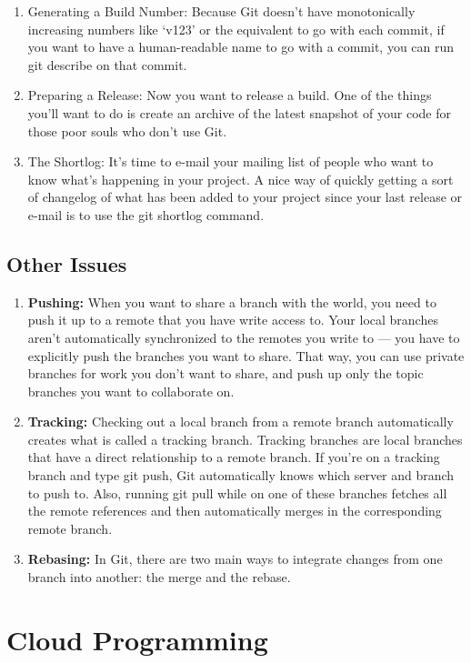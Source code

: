 \documentclass[draftclsnofoot,journal,onecolumn,12pt]{IEEEtran}
\begin{document}
\begin{enumerate}
  \item Generating a Build Number: Because Git doesn’t have monotonically increasing numbers like ‘v123’ or the equivalent to go with each commit, if you want to have a human-readable name to go with a commit, you can run git describe on that commit.
  \item Preparing a Release: Now you want to release a build. One of the things you’ll want to do is create an archive of the latest snapshot of your code for those poor souls who don’t use Git.
  \item The Shortlog: It’s time to e-mail your mailing list of people who want to know what’s happening in your project. A nice way of quickly getting a sort of changelog of what has been added to your project since your last release or e-mail is to use the git shortlog command.
\end{enumerate}

\subsection{Other Issues}
\begin{enumerate}
  \item \textbf{Pushing:} When you want to share a branch with the world, you need to push it up to a remote that you have write access to. Your local branches aren’t automatically synchronized to the remotes you write to — you have to explicitly push the branches you want to share. That way, you can use private branches for work you don’t want to share, and push up only the topic branches you want to collaborate on.
  \item \textbf{Tracking:} Checking out a local branch from a remote branch automatically creates what is called a tracking branch. Tracking branches are local branches that have a direct relationship to a remote branch. If you’re on a tracking branch and type git push, Git automatically knows which server and branch to push to. Also, running git pull while on one of these branches fetches all the remote references and then automatically merges in the corresponding remote branch.
  \item \textbf{Rebasing:} In Git, there are two main ways to integrate changes from one branch into another: the merge and the rebase.
\end{enumerate}


\section{Cloud Programming}
\end{document}
